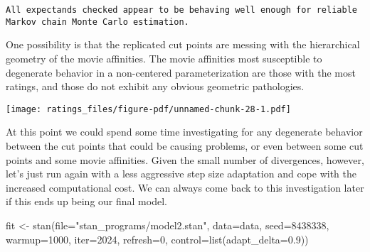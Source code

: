 \documentclass[
  letterpaper,
  DIV=11,
  numbers=noendperiod]{scrartcl}
\newenvironment{Shaded}{\begin{snugshade}}{\end{snugshade}}
\newcommand{\AttributeTok}[1]{\textcolor[rgb]{0.40,0.45,0.13}{#1}}
\newcommand{\ControlFlowTok}[1]{\textcolor[rgb]{0.00,0.23,0.31}{#1}}
\newcommand{\DecValTok}[1]{\textcolor[rgb]{0.68,0.00,0.00}{#1}}
\newcommand{\FloatTok}[1]{\textcolor[rgb]{0.68,0.00,0.00}{#1}}
\newcommand{\FunctionTok}[1]{\textcolor[rgb]{0.28,0.35,0.67}{#1}}
\newcommand{\NormalTok}[1]{\textcolor[rgb]{0.00,0.23,0.31}{#1}}
\newcommand{\OtherTok}[1]{\textcolor[rgb]{0.00,0.23,0.31}{#1}}
\newcommand{\SpecialCharTok}[1]{\textcolor[rgb]{0.37,0.37,0.37}{#1}}
\newcommand{\StringTok}[1]{\textcolor[rgb]{0.13,0.47,0.30}{#1}}
\begin{document}
\begin{verbatim}
All expectands checked appear to be behaving well enough for reliable
Markov chain Monte Carlo estimation.
\end{verbatim}

One possibility is that the replicated cut points are messing with the
hierarchical geometry of the movie affinities. The movie affinities most
susceptible to degenerate behavior in a non-centered parameterization
are those with the most ratings, and those do not exhibit any obvious
geometric pathologies.

\begin{Shaded}
\end{Shaded}

\texttt{[image: ratings\_files/figure-pdf/unnamed-chunk-28-1.pdf]}

At this point we could spend some time investigating for any degenerate
behavior between the cut points that could be causing problems, or even
between some cut points and some movie affinities. Given the small
number of divergences, however, let's just run again with a less
aggressive step size adaptation and cope with the increased
computational cost. We can always come back to this investigation later
if this ends up being our final model.

\begin{Shaded}
\begin{Highlighting}[]
\NormalTok{fit }\OtherTok{\textless{}{-}} \FunctionTok{stan}\NormalTok{(}\AttributeTok{file=}\StringTok{"stan\_programs/model2.stan"}\NormalTok{,}
            \AttributeTok{data=}\NormalTok{data, }\AttributeTok{seed=}\DecValTok{8438338}\NormalTok{,}
            \AttributeTok{warmup=}\DecValTok{1000}\NormalTok{, }\AttributeTok{iter=}\DecValTok{2024}\NormalTok{, }\AttributeTok{refresh=}\DecValTok{0}\NormalTok{,}
            \AttributeTok{control=}\FunctionTok{list}\NormalTok{(}\StringTok{\textquotesingle{}adapt\_delta\textquotesingle{}}\OtherTok{=}\FloatTok{0.9}\NormalTok{))}
\end{Highlighting}
\end{Shaded}
\end{document}
